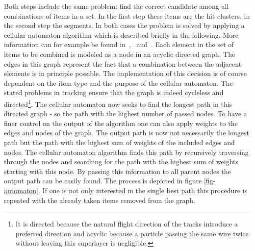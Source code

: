 Both steps include the same problem: find the correct candidate among all combinations of items in a set. In the first step these items are the hit clusters, in the second step the segments. In both cases the problem is solved by applying a cellular automaton algorithm which is described briefly in the following. More information can for example be found in~\cite{cats},~\cite{kisel} and~\cite{oliver}. Each element in the set of items to be combined is modeled as a node in an acyclic directed graph. The edges in this graph represent the fact that a combination between the adjacent elements is in principle possible. The implementation of this decision is of course dependent on the item type and the purpose of the cellular automaton. The stated problems in tracking ensure that the graph is indeed cycleless and directed\footnote{It is directed because the natural flight direction of the tracks introduce a preferred direction and acyclic because a particle passing the same wire twice without leaving this superlayer is negligible.}. The cellular automaton now seeks to find the longest path in this directed graph - so the path with the highest number of passed nodes. To have a finer control on the output of the algorithm one can also apply weights to the edges and nodes of the graph. The output path is now not necessarily the longest path but the path with the highest sum of weights of the included edges and nodes. The cellular automaton algorithm finds this path by recursively traversing through the nodes and searching for the path with the highest sum of weights starting with this node. By passing this information to all parent nodes the output path can be easily found. The process is depicted in figure \ref{fig-automaton}. If one is not only interested in the single best path this procedure is repeated with the already taken items removed from the graph.

